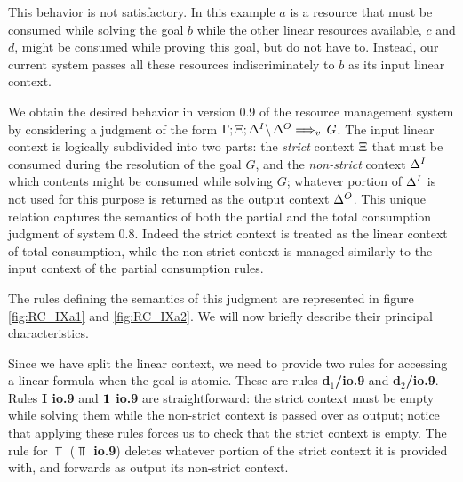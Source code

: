 This behavior is not satisfactory. In this example $a$ is a resource that
must be consumed while solving the goal $b$ while the other linear resources
available, $c$ and $d$, might be consumed while proving this goal, but do not
have to. Instead, our current system passes all these resources
indiscriminately to $b$ as its input linear context.

We obtain the desired behavior in version 0.9 of the resource management
system by considering a judgment of the form $\ioIX{\G;\X;\D^I}{\D^O}{G}{v}$.
The input linear context is logically subdivided into two parts: the {\em
  strict\/} context $\X$ that must be consumed during the resolution of the
goal $G$, and the {\em non-strict\/} context $\D^I$ which contents might be
consumed while solving $G$; whatever portion of $\D^I$ is not used for this
purpose is returned as the output context $\D^O$. This unique relation
captures the semantics of both the partial and the total consumption judgment
of system 0.8. Indeed the strict context is treated as the linear context of
total consumption, while the non-strict context is managed similarly to the
input context of the partial consumption rules.

The rules defining the semantics of this judgment are represented in figure
\ref{fig:RC_IXa1} and \ref{fig:RC_IXa2}. We will now briefly describe their
principal characteristics.

Since we have split the linear context, we need to provide two rules for
accessing a linear formula when the goal is atomic. These are rules {\bf
  d$_1$/io.9} and {\bf d$_2$/io.9}. Rules {\bf I io.9} and {\bf $\One$ io.9}
are straightforward: the strict context must be empty while solving them
while the non-strict context is passed over as output; notice that applying
these rules forces us to check that the strict context is empty. The rule for
$\Top$ ({\bf $\Top$ io.9}) deletes whatever portion of the strict context it
is provided with, and forwards as output its non-strict context.

